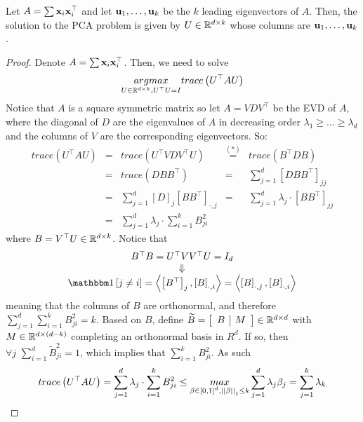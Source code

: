 \begin{theorem}\label{pca_closest_subspace}
Let $A=\sum\mathbf{x}_i\mathbf{x}_i^\top$ and let $\mathbf{u}_1,\ldots,\mathbf{u}_k$ be the $k$ leading eigenvectors of $A$. Then, the solution to the PCA problem is given by $U\in\mathbb{R}^{d\times k}$ whose columns are $\mathbf{u}_1,\ldots,\mathbf{u}_k$.
\end{theorem}
\begin{proof}
Denote $A=\sum\mathbf{x}_i\mathbf{x}_i^\top$. Then, we need to solve $$ \underset{U\in\mathbb{R}^{d\times k},U^\top U=I}{argmax} trace\left(U^\top A U\right)$$
Notice that $A$ is a square symmetric matrix so let $A=VDV^\top$ be the EVD of $A$, where the diagonal of $D$ are the eigenvalues of $A$ in decreasing order $\lambda_1\geq \ldots \geq \lambda_d$ and the columns of $V$ are the corresponding eigenvectors. So:
$$
\begin{array}{cclcl}
trace\left(U^\top AU\right) & = & trace\left(U^\top V D V^\top U\right) & \overset{\left(*\right)}{=} & trace\left(B^\top D B\right)\\
& = & trace\left(DBB^\top\right) &=& \sum_{j=1}^d\left[DBB^\top\right]_{jj} \\
& = & \sum_{j=1}^d \left[D\right]_{j} \left[BB^\top\right]_{\cdot,j} & = & \sum_{j=1}^d \lambda_j\cdot \left[BB^\top\right]_{jj} \\
& = & \sum_{j=1}^d \lambda_j\cdot \sum_{i=1}^k B_{ji}^2
\end{array}
$$
where $B=V^\top U\in \mathbb{R}^{d\times k}$. Notice that 
$$
\begin{array}{c}
B^\top B=U^\top VV^\top U = I_d\\
\Downarrow\\
\indc{j\neq i} = \inprod{\left[B^\top\right]_j}{\left[B\right]_{\cdot,i}} = \inprod{\left[B\right]_{\cdot,j}}{\left[B\right]_{\cdot,i}}
\end{array}$$
meaning that the columns of $B$ are orthonormal, and therefore $\sum_{j=1}^d\sum_{i=1}^k B_{ji}^2 = k$. Based on $B$, define $\widetilde{B}=\left[\begin{array}{c|c} B & M\end{array}\right] \in \mathbb{R}^{d \times d}$ with $M\in\mathbb{R}^{d\times \left(d-k\right)}$ completing an orthonormal basis in $R^d$. If so, then $\forall j\,\, \sum_{i=1}^d\widetilde{B}^2_{ji}=1$, which implies that $\sum_{i=1}^k B_{ji}^2$. As such 
$$ trace\left(U^\top A U\right) = \sum_{j=1}^d \lambda_j\cdot \sum_{i=1}^k B_{ji}^2 \leq \underset{\beta\in \left[0,1\right]^d, \left|\left| \beta\right|\right|_1\leq k}{max} \sum_{j=1}^d \lambda_j \beta_j =\sum_{j=1}^k \lambda_k$$


\end{proof}
